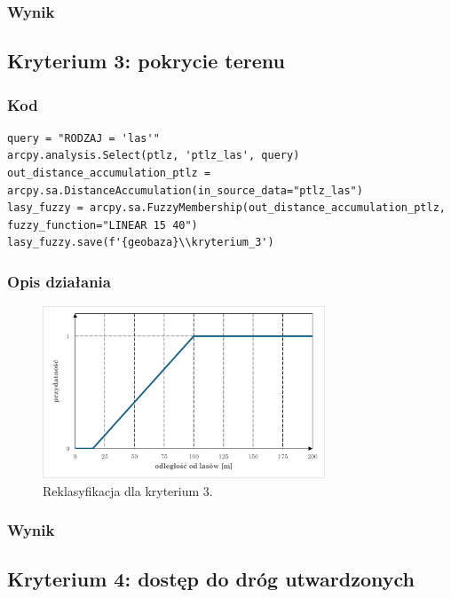 \documentclass{article}
\begin{document}
\subsubsection{Wynik}
\newpage
\subsection{Kryterium 3: pokrycie terenu}
\subsubsection{Kod}
\begin{lstlisting}
query = "RODZAJ = 'las'"
arcpy.analysis.Select(ptlz, 'ptlz_las', query)
out_distance_accumulation_ptlz = arcpy.sa.DistanceAccumulation(in_source_data="ptlz_las")
lasy_fuzzy = arcpy.sa.FuzzyMembership(out_distance_accumulation_ptlz, fuzzy_function="LINEAR 15 40")
lasy_fuzzy.save(f'{geobaza}\\kryterium_3')
\end{lstlisting}

\subsubsection{Opis działania}
\begin{figure}[H]
    \centering
    \includegraphics[width=0.75\textwidth]{img/kryterium3-wykres-glowny.png}
    \caption*{Reklasyfikacja dla kryterium 3.}
\end{figure}
\subsubsection{Wynik}
\newpage
\subsection{Kryterium 4: dostęp do dróg utwardzonych}
\end{document}
